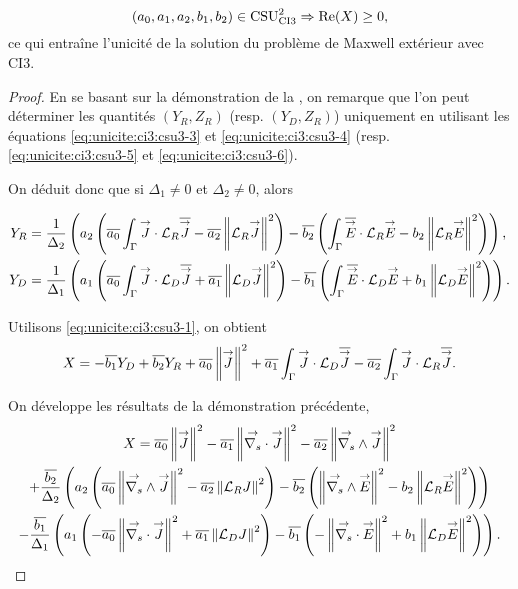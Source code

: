   
 \begin{prop}
    \label{prop:csu:ci3-2}
    \begin{equation*}
      (a_0,a_1,a_2,b_1,b_2) \in \CSU[2]{CI3} \Rightarrow \Re(X) \ge 0,
    \end{equation*}
    ce qui entraîne l'unicité de la solution du problème de Maxwell extérieur avec CI3.
  \end{prop}

  \begin{proof}
    En se basant sur la démonstration de la , on remarque que l'on peut déterminer les quantités \((Y_R,Z_R)\) (resp. \((Y_D,Z_R)\)) uniquement en utilisant les équations \eqref{eq:unicite:ci3:csu3-3} et \eqref{eq:unicite:ci3:csu3-4} (resp. \eqref{eq:unicite:ci3:csu3-5} et \eqref{eq:unicite:ci3:csu3-6}).

    On déduit donc que si \(\Delta_1 \not = 0\) et \(\Delta_2 \not = 0\), alors

    \begin{align*}
      Y_R &= \frac{1}{\Delta_2}\left(a_2\left(\conj{a_0}\int_\Gamma \vJ\cdot\LR\conj{\vJ} - \conj{a_2}\norm{\LR \vJ}^2\right)  -\conj{b_2}\left(\int_\Gamma \conj{\vE}\cdot\LR{\vE} - b_2 \norm{\LR \vE}^2\right)\right), \\
      Y_D &= \frac{1}{\Delta_1}\left(a_1\left(\conj{a_0}\int_\Gamma \vJ\cdot\LD\conj{\vJ} + \conj{a_1}\norm{\LD \vJ}^2\right)  -\conj{b_1}\left(\int_\Gamma \conj{\vE}\cdot\LD{\vE} + b_1 \norm{\LD \vE}^2\right)\right).
    \end{align*}

    Utilisons \eqref{eq:unicite:ci3:csu3-1}, on obtient
    \begin{equation*}
      X = -\conj{b_1} Y_D + \conj{b_2} Y_R + \conj{a_0} \norm{\vJ}^2 + \conj{a_1} \int_\Gamma \vJ \cdot \LD \conj{\vJ} - \conj{a_2} \int_\Gamma \vJ \cdot \LR \conj{\vJ}.
    \end{equation*}

    On développe les résultats de la démonstration précédente,
    \begin{multline*}
      X = \conj{a_0} \norm{\vJ }^2 - \conj{a_1} \norm{\vdivs \vJ }^2 - \conj{a_2} \norm{\vrots \vJ }^2
      \\
      + \frac{\conj{b_2}}{\Delta_2}\left(a_2\left(\conj{a_0}\norm{\vrots \vJ}^2 - \conj{a_2}\norm{\LR J}^2\right)  -\conj{b_2}\left(\norm{\vrots\vE}^2 - b_2 \norm{\LR \vE }^2\right)\right)
      \\
      - \frac{\conj{b_1}}{\Delta_1}\left(a_1\left(-\conj{a_0}\norm{\vdivs\vJ}^2 + \conj{a_1}\norm{\LD J}^2\right)  -\conj{b_1}\left(-\norm{\vdivs\vE}^2 + b_1 \norm{\LD \vE }^2\right)\right).
    \end{multline*}


\end{proof}
